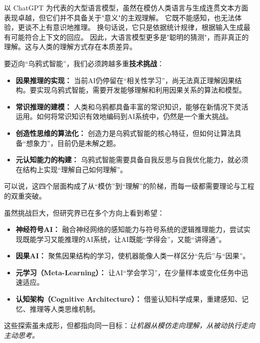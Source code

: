 以 ChatGPT 为代表的大型语言模型，虽然在模仿人类语言与生成连贯文本方面表现卓越，但它们并不具备关于"意义"的主观理解。   
它既不能感知，也无法体验，更谈不上有意识地推理。  
换句话说，它只是依据统计规律，根据输入生成最有可能符合上下文的回应。  
因此，大语言模型更多是"聪明的猜测"，而非真正的理解。这与人类的理解方式存在本质差异。  


要迈向“乌鸦式智能”，我们必须跨越多重\textbf{技术挑战}：  
\begin{itemize}
\item \textbf{因果推理的实现：} 当前AI仍停留在“相关性学习”，尚无法真正理解因果结构。要实现乌鸦式智能，需要开发能够理解和利用因果关系的算法和模型。  
\item \textbf{常识推理的建模：} 人类和乌鸦都具备丰富的常识知识，能够在新情况下灵活运用。如何将常识知识有效地编码到AI系统中，仍然是一个重大挑战。  
\item \textbf{创造性思维的算法化：} 创造力是乌鸦式智能的核心特征，但如何让算法具备“想象力”，目前仍是未解之题。  
\item \textbf{元认知能力的构建：} 乌鸦式智能需要具备自我反思与自我优化能力，就必须在结构上实现“理解自己如何理解”。  
\end{itemize}
可以说，这四个层面构成了从“模仿”到“理解”的阶梯，而每一级都需要理论与工程的双重突破。  


虽然挑战巨大，但研究界已在多个方向上看到希望：  
\begin{itemize}
\item \textbf{神经符号AI：} 融合神经网络的感知能力与符号系统的逻辑推理能力，尝试实现既能学习又能推理的AI系统，让AI既能“学得会”，又能“讲得通”。  
\item \textbf{因果AI：} 聚焦因果结构的学习，使机器能像人类一样区分“先后”与“因果”。  
\item \textbf{元学习（Meta-Learning）：} 让AI“学会学习”，在少量样本或变化任务中迅速适应。  
\item \textbf{认知架构（Cognitive Architecture）：} 借鉴认知科学成果，重建感知、记忆、推理等人类思维机制。  
\end{itemize}
这些探索虽未成形，但都指向同一目标：\emph{让机器从模仿走向理解，从被动执行走向主动思考。}  


